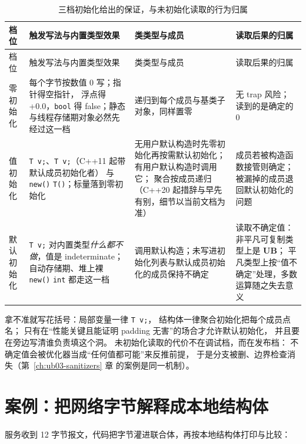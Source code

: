 \documentclass[12pt,a4paper,fontset=fandol]{ctexbook}
\newcommand{\cpp}[1]{C++#1}
\newcommand{\Fn}[1]{\texttt{#1()}}
\newcommand{\Tp}[1]{\texttt{#1}}
\newcommand{\UB}{\textbf{\textsf{UB}}}
\begin{document}
\begin{longtable}{@{}>{\raggedright\arraybackslash}p{} >{\raggedright\arraybackslash}p{} >{\raggedright\arraybackslash}p{} >{\raggedright\arraybackslash}p{}@{}}
\caption{三档初始化给出的保证，与未初始化读取的行为归属}\label{tab:ub04-init-kinds}\\
\toprule
档位 & 触发写法与内置类型效果 & 类类型与成员 & 读取后果的归属 \\
\midrule
\endfirsthead
\toprule
档位 & 触发写法与内置类型效果 & 类类型与成员 & 读取后果的归属 \\
\midrule
\endhead
\bottomrule
\endfoot
零初始化 & 每个字节按数值 0 写；指针得空指针，
浮点得 +0.0，\Tp{bool} 得 false；静态与线程存储期对象必然先经过这一档 &
递归到每个成员与基类子对象，同样置零 &
无 trap 风险；读到的是确定的 0 \\
值初始化 & \Tp{T v{};}、\Tp{T v;}（\cpp{11} 起带默认成员初始化者）
与 \Fn{new} \Tp{T()}；标量落到零初始化 &
无用户默认构造时先零初始化再按需默认初始化；
有用户默认构造时调用它；
聚合按成员递归（\cpp{20} 起措辞与早先有别，细节以当前文档为准） &
成员若被构造函数接管则确定；
被漏掉的成员退回默认初始化的问题 \\
默认初始化 & \Tp{T v;} 对内置类型\emph{什么都不做}，值是 indeterminate；
自动存储期、堆上裸 \Fn{new} \Tp{int} 都走这一档 &
调用默认构造；未写进初始化列表与默认成员初始化的成员保持不确定 &
读取不确定值：非平凡可复制类型上是 \UB{}；
平凡类型上按“值不确定”处理，多数运算随之失去意义 \\
\end{longtable}

\begin{guideline}[title={三档选择}]
拿不准就写花括号：局部变量一律 \Tp{T v{};}，
结构体一律聚合初始化把每个成员点名；
只有在“性能关键且能证明 padding 无害”的场合才允许默认初始化，
并且要在旁边写清谁负责填这个洞。
未初始化读取的代价不在调试档，而在发布档：
不确定值会被优化器当成“任何值都可能”来反推前提，
于是分支被删、边界检查消失（第~\ref{ch:ub03-sanitizers} 章 的案例是同一机制）。
\end{guideline}

\section{案例：把网络字节解释成本地结构体}\label{sec:ub04-case-wire-union}

\begin{casebox}[title={同一份报文，两次运行给出不同结果}]
服务收到 12 字节报文，代码把字节灌进联合体，再按本地结构体打印与比较：
\end{casebox}
\end{document}

